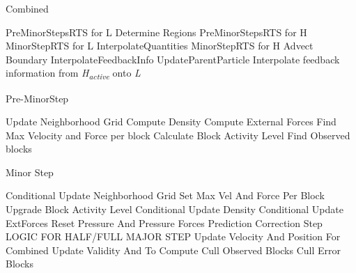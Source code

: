 \documentclass[../../main.tex]{subfiles}
\begin{document}
\label{la:1}
\label{la:2}
\label{la:3}
\label{la:4}

\begin{algorithm}
    \caption{Combined}
    \label{alg:twoscale}
    \begin{algorithmic}[1]
            \State PreMinorStepsRTS for L
            \State Determine Regions
            \State PreMinorStepsRTS for H
                \State MinorStepRTS for L
                \State InterpolateQuantities
                  \State MinorStepRTS for H
                  \State Advect Boundary
                \EndFor
            \State InterpolateFeedbackInfo
            \EndFor
            \State UpdateParentParticle
            \State Interpolate feedback information from \textit{{\texorpdfstring{H\textsubscript{active}}{H active}}} onto \textit{L}
        \EndWhile
   \end{algorithmic}
\end{algorithm}

\begin{algorithm}
    \caption{Pre-MinorStep}
    \label{alg:twoscale}
    \begin{algorithmic}[1]
    \State Update Neighborhood Grid
    \State Compute Density
    \State Compute External Forces
    \State Find Max Velocity and Force per block
    \State Calculate Block Activity Level
    \State Find Observed blocks
   \end{algorithmic}
\end{algorithm}

\begin{algorithm}
    \caption{Minor Step}
    \label{alg:twoscale}
    \begin{algorithmic}[1]
        \State Conditional Update Neighborhood Grid 
    \EndIf 
    \State Set Max Vel And Force Per Block
    \State Upgrade Block Activity Level
        \State Conditional Update Density 
        \State Conditional Update ExtForces 
    \EndIf 
    \State Reset Pressure And Pressure Forces
    \State Prediction Correction Step
    \State LOGIC FOR HALF/FULL MAJOR STEP
    \State Update Velocity And Position For Combined
    \State Update Validity And To Compute
    \State Cull Observed Blocks
	\State Cull Error Blocks
   \end{algorithmic}
\end{algorithm}
\end{document}
